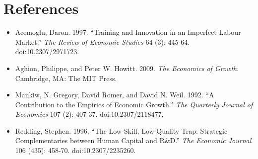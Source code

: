 \documentclass[a4paper,11pt]{article} %
\begin{document}
\section*{References}
\begin{flushleft}
\begin{itemize}
\item[] Acemoglu, Daron. 1997. ``Training and Innovation in an Imperfect Labour Market.'' \textit{The Review of Economic Studies} 64 (3): 445-64. doi:10.2307/2971723.
\item[] Aghion, Philippe, and Peter W. Howitt. 2009. \textit{The Economics of Growth}. Cambridge, MA: The MIT Press.
\item[] Mankiw, N. Gregory, David Romer, and David N. Weil. 1992. ``A Contribution to the Empirics of Economic Growth.'' \textit{The Quarterly Journal of Economics} 107 (2): 407-37. doi:10.2307/2118477.
\item[] Redding, Stephen. 1996. ``The Low-Skill, Low-Quality Trap: Strategic Complementaries between Human Capital and R\&D.'' \textit{The Economic Journal} 106 (435): 458-70. doi:10.2307/2235260.
\end{itemize}
\end{flushleft}
 
\end{document}
